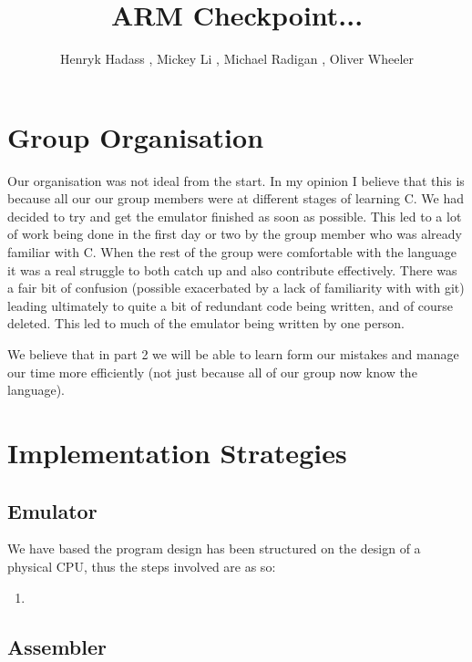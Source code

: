 \documentclass[11pt]{article}
\begin{document}
\title{ARM Checkpoint... }
\author{Henryk Hadass , Mickey Li , Michael Radigan , Oliver Wheeler}

\maketitle

\section{Group Organisation}

Our organisation was not ideal from the start. In my opinion I believe that this is because all our our group members were at different stages of learning C. We had decided to try and get the emulator finished as soon as possible. This led to a lot of work being done in the first day or two by the group member who was already familiar with C. When the rest of the group were comfortable with the language it was a real struggle to both catch up and also contribute effectively. There was a fair bit of confusion (possible exacerbated by a lack of familiarity with with git) leading ultimately to quite a bit of redundant code being written, and of course deleted. This led to much of the emulator being written by one person.

We believe that in part 2 we will be able to learn form our mistakes and manage our time more efficiently (not just because all of our group now know the language). 



\section{Implementation Strategies}
\subsection{Emulator}
We have based the program design has been structured on the design of a physical CPU, thus the steps involved are as so:
\begin{enumerate}
\item



\end{enumerate}

\subsection{Assembler}
\end{document}
